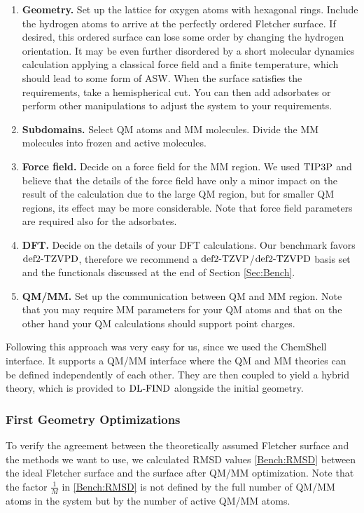\begin{enumerate}
  \item \textbf{Geometry.} Set up the lattice for oxygen atoms with hexagonal
  rings. Include the hydrogen atoms to arrive at the perfectly ordered Fletcher
  surface. If desired, this ordered surface can lose some order by changing the
  hydrogen orientation. It may be even further disordered by a short molecular
  dynamics calculation applying a classical force field and a finite
  temperature, which should lead to some form of ASW. When the surface satisfies the
  requirements, take a hemispherical cut. You can then add adsorbates or 
  perform other manipulations to adjust the system to your requirements.
  \item \textbf{Subdomains.} Select QM atoms and MM molecules. Divide
  the MM molecules into frozen and active molecules.
  \item \textbf{Force field.} Decide on a force field for the MM region.
  We used $\text{TIP3P}$ and believe that the details of the force field have only
  a minor impact on the result of the calculation due to the large
  QM region, but for smaller QM regions, its effect may be more considerable.
  Note that force field parameters are required also for the adsorbates.
  \item \textbf{DFT.} Decide on the details of your DFT calculations. Our
  benchmark favors $\text{def2-TZVPD}$, therefore we recommend a $\text{def2-TZVP}$/$\text{def2-TZVPD}$ basis
  set and the functionals discussed at the end of Section \ref{Sec:Bench}.
  \item \textbf{QM/MM.} Set up the communication between QM and MM region. Note
  that you may require MM parameters for your QM atoms and that on the other
  hand your QM calculations should support point charges.
\end{enumerate}
Following this approach was very easy for us, since we used the
ChemShell interface. It supports a QM/MM interface where the QM and MM
theories can be defined independently of each other. They are then coupled to
yield a hybrid theory, which is provided to $\text{DL-FIND}$ alongside the initial
geometry.

\subsubsection{First Geometry Optimizations}
\label{Sec:Ads:Optima}

To verify the agreement between the theoretically assumed Fletcher surface and the
methods we want to use, we calculated RMSD values \eqref{Bench:RMSD} between
the ideal Fletcher surface and the surface after QM/MM optimization.
Note that the factor $\frac 1 M$ in \eqref{Bench:RMSD} is not defined by the
full number of QM/MM atoms in the system but by the number of active QM/MM atoms.


